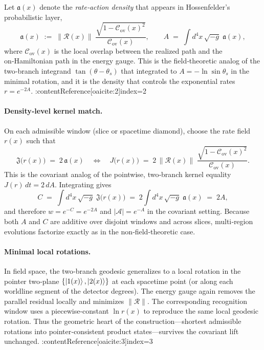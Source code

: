 \documentclass[11pt,letterpaper]{article}
\begin{document}
Let \(\mathfrak a(x)\) denote the \emph{rate‑action density} that appears in Hossenfelder’s probabilistic layer,
\begin{equation}
\mathfrak a(x)\;:=\;\bigl\|\mathcal R(x)\bigr\|\;\frac{\sqrt{1-\mathcal C_{\mathrm{ov}}(x)^2}}{\mathcal C_{\mathrm{ov}}(x)},
\qquad
A\;=\;\int d^4x\,\sqrt{-g}\;\mathfrak a(x),
\end{equation}
where \(\mathcal C_{\mathrm{ov}}(x)\) is the local overlap between the realized path and the on‑Hamiltonian path in the energy gauge. This is the field‑theoretic analog of the two‑branch integrand \(\tan(\theta-\theta_s)\) that integrated to \(A=-\ln\sin\theta_s\) in the minimal rotation, and it is the density that controls the exponential rates \(r=e^{-2A}\). :contentReference[oaicite:2]{index=2}

\paragraph{Density‑level kernel match.}
On each admissible window (slice or spacetime diamond), choose the rate field \(r(x)\) such that
\begin{equation}
\mathfrak J\bigl(r(x)\bigr)\;=\;2\,\mathfrak a(x)
\quad\Longleftrightarrow\quad
J\!\bigl(r(x)\bigr)\;=\;2\,\bigl\|\mathcal R(x)\bigr\|\;\frac{\sqrt{1-\mathcal C_{\mathrm{ov}}(x)^2}}{\mathcal C_{\mathrm{ov}}(x)}.
\end{equation}
This is the covariant analog of the pointwise, two‑branch kernel equality \(J(r)\,dt=2\,dA\). Integrating gives
\begin{equation}
C\;=\;\int d^4x\,\sqrt{-g}\;\mathfrak J\bigl(r(x)\bigr)
\;=\;2\int d^4x\,\sqrt{-g}\;\mathfrak a(x)
\;=\;2A,
\end{equation}
and therefore \(w=e^{-C}=e^{-2A}\) and \(|\mathcal A|=e^{-A}\) in the covariant setting. Because both \(A\) and \(C\) are additive over disjoint windows and across slices, multi‑region evolutions factorize exactly as in the non‑field‑theoretic case.

\paragraph{Minimal local rotations.}
In field space, the two‑branch geodesic generalizes to a local rotation in the pointer two‑plane \(\{\ket{1(x)},\ket{2(x)}\}\) at each spacetime point (or along each worldline segment of the detector degrees). The energy gauge again removes the parallel residual locally and minimizes \(\|\mathcal R\|\). The corresponding recognition window uses a piecewise‑constant \(\ln r(x)\) to reproduce the same local geodesic rotation. Thus the geometric heart of the construction—shortest admissible rotations into pointer‑consistent product states—survives the covariant lift unchanged. :contentReference[oaicite:3]{index=3}
\end{document}
